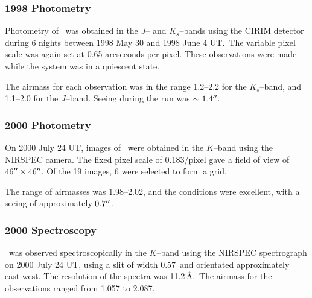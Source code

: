 \subsubsection{1998 Photometry}\label{cha:GROJ1655-40:sec:ObservationsOfJ1655:subsec:DetailsOfTheObservations:subsubsec:1998Photometry}

Photometry of \groj\ was obtained in the $J$-- and $K_s$--bands using
the CIRIM detector during 6 nights between 1998 May 30 and 1998 June 4
UT.\@\ The variable pixel scale was again set at 0.65 arcseconds per pixel. These observations were made while the system was in a quiescent state. %

\vspace{\myparskip}

The airmass for each observation was in the range 1.2--2.2 for the
$K_s$--band, and 1.1--2.0 for the $J$--band. Seeing during the run was $\sim 1.4\hbox{$^{\prime\prime}$}$. %

\subsubsection{2000 Photometry}\label{cha:GROJ1655-40:sec:ObservationsOfJ1655:subsec:DetailsOfTheObservations:subsubsec:2000Photometry}

On 2000 July 24 UT, images of \groj\ were obtained in the $K$--band
using the NIRSPEC camera.  The fixed pixel scale of 0.183\arcsec/pixel
gave a field of view of $46\hbox{$^{\prime\prime}$}\times46\hbox{$^{\prime\prime}$}$. Of the 19 images,
6 were selected to form a grid. %

\vspace{\myparskip}

The range of airmasses was 1.98--2.02, and the conditions were
excellent, with a seeing of approximately $0.7\hbox{$^{\prime\prime}$}$. %

\subsubsection{2000 Spectroscopy}\label{cha:GROJ1655-40:sec:ObservationsOfJ1655:subsec:DetailsOfTheObservations:subsubsec:2000Spectroscopy}

\groj\ was observed spectroscopically in the $K$--band using the NIRSPEC
spectrograph on 2000 July 24 UT, using a slit of width 0.57\arcsec\ and
orientated approximately east-west. The resolution of the spectra was
11.2\,\AA.\@\ The airmass for the observations ranged from 1.057 to
2.087. %

\vspace{\myparskip}

